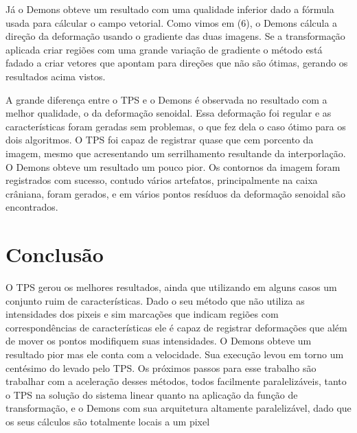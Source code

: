 \documentclass[]{spie}  %
\begin{document}
	Já o Demons obteve um resultado com uma qualidade inferior dado a fórmula usada para cálcular o campo vetorial.
Como vimos em (6), o Demons cálcula a direção da deformação usando o gradiente das duas imagens. Se a transformação
aplicada criar regiões com uma grande variação de gradiente o método está fadado a criar vetores que apontam para 
direções que não são ótimas, gerando os resultados acima vistos.

	A grande diferença entre o TPS e o Demons é observada no resultado com a melhor qualidade, o da deformação
senoidal. Essa deformação foi regular e as características foram geradas sem problemas, o que fez dela o caso ótimo
para os dois algoritmos. O TPS foi capaz de registrar quase que cem porcento da imagem, mesmo que acresentando um
serrilhamento resultande da interporlação. O Demons obteve um resultado um pouco pior. Os contornos da imagem foram
registrados com sucesso, contudo vários artefatos, principalmente na caixa crâniana, foram gerados, e em vários pontos
resíduos da deformação senoidal são encontrados.

\section{Conclusão}
	O TPS gerou os melhores resultados, ainda que utilizando em alguns casos um conjunto ruim de características. Dado 
o seu método que não utiliza as intensidades dos pixeis e sim marcações que indicam regiões com correspondências de 
características ele é capaz de registrar deformações que além de mover os pontos modifiquem suas intensidades. O Demons
obteve um resultado pior mas ele conta com a velocidade. Sua execução levou em torno um centésimo do levado pelo TPS. Os 
próximos passos para esse trabalho são trabalhar com a aceleração desses métodos, todos
facilmente paralelizáveis, tanto o TPS na solução do sistema linear quanto na aplicação da função de transformação, e o 
Demons com sua arquitetura altamente paralelizável, dado que os seus cálculos são totalmente locais a um pixel
\end{document}

